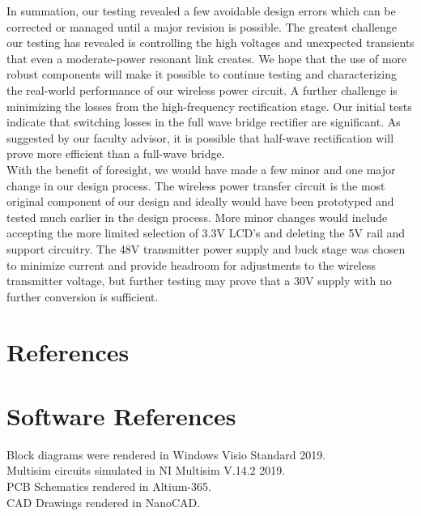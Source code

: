\documentclass[12pt]{article}
\begin{document}
\indent
In summation, our testing revealed a few avoidable design errors which can be corrected or managed until a major revision is possible. The greatest challenge our testing has revealed is controlling the high voltages and unexpected transients that even a moderate-power resonant link creates. We hope that the use of more robust components will make it possible to continue testing and characterizing the real-world performance of our wireless power circuit. A further challenge is minimizing the losses from the high-frequency rectification stage. Our initial tests indicate that switching losses in the full wave bridge rectifier are significant. As suggested by our faculty advisor, it is possible that half-wave rectification will prove more efficient than a full-wave bridge.\\

\indent
With the benefit of foresight, we would have made a few minor and one major change in our design process. The wireless power transfer circuit is the most original component of our design and ideally would have been prototyped and tested much earlier in the design process. More minor changes would include accepting the more limited selection of 3.3V LCD’s and deleting the 5V rail and support circuitry. The 48V transmitter power supply and buck stage was chosen to minimize current and provide headroom for adjustments to the wireless transmitter voltage, but further testing may prove that a 30V supply with no further conversion is sufficient.

\pagebreak

\section{References}

\section*{Software References}

Block diagrams were rendered in Windows Visio Standard 2019.\\
Multisim circuits simulated in NI Multisim V.14.2 2019.\\
PCB Schematics rendered in Altium-365.\\
CAD Drawings rendered in NanoCAD.\\

\end{document}
